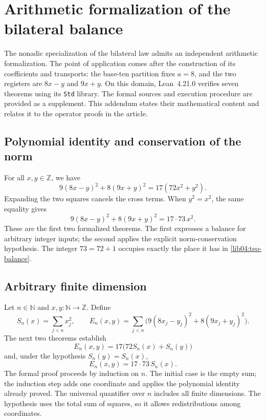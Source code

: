\section*{Arithmetic formalization of the bilateral balance}
\label{libro:formalizacion-lean}

The nonadic specialization of the bilateral law admits an independent
arithmetic formalization. The point of application comes after the
construction of its coefficients and transports: the base-ten partition fixes
\(a=8\), and the two registers are \(8x-y\) and \(9x+y\). On this domain,
Lean~4.21.0 verifies seven theorems using its \texttt{Std} library. The formal
sources and execution procedure are provided as a supplement.
This addendum states their mathematical content and relates it to
the operator proofs in the article.

\subsection*{Polynomial identity and conservation of the norm}

For all \(x,y\in\mathbb Z\), we have
\[
 9(8x-y)^2+8(9x+y)^2=17(72x^2+y^2).
\]
Expanding the two squares cancels the cross terms. When
\(y^2=x^2\), the same equality gives
\[
 9(8x-y)^2+8(9x+y)^2=17\cdot73\,x^2.
\]
These are the first two formalized theorems. The first expresses a
balance for arbitrary integer inputs; the second applies the
explicit norm-conservation hypothesis. The integer \(73=72+1\) occupies
exactly the place it has in \cref{lib04:teo-balance}.

\subsection*{Arbitrary finite dimension}

Let \(n\in\mathbb N\) and \(x,y:\mathbb N\to\mathbb Z\). Define
\[
 S_n(x)=\sum_{j<n}x_j^2,
 \qquad
 E_n(x,y)=\sum_{j<n}\bigl(9(8x_j-y_j)^2+8(9x_j+y_j)^2\bigr).
\]
The next two theorems establish
\[
 E_n(x,y)=17\bigl(72S_n(x)+S_n(y)\bigr)
\]
and, under the hypothesis \(S_n(y)=S_n(x)\),
\[
 E_n(x,y)=17\cdot73\,S_n(x).
\]
The formal proof proceeds by induction on \(n\). The initial case is the
empty sum; the induction step adds one coordinate and applies the polynomial
identity already proved. The universal quantifier over \(n\) includes
all finite dimensions. The hypothesis uses the total sum of
squares, so it allows redistributions among coordinates.

